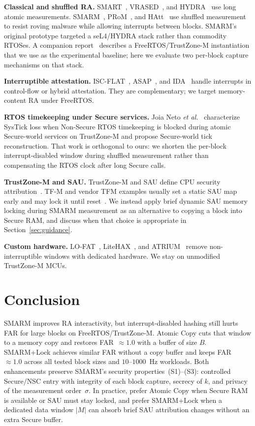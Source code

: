 \documentclass[conference]{IEEEtran}
\newcommand{\smarmlock}{SMARM+Lock\xspace}
\begin{document}
\textbf{Classical and shuffled RA.}
SMART~\cite{eldefrawy2012smart}, VRASED~\cite{nunes2019vrased}, and
HYDRA~\cite{eldefrawy2017hydra} use long atomic measurements.
SMARM~\cite{carpent2018smarm}, PRoM~\cite{aman2021prom}, and
HAtt~\cite{aman2018hatt} use shuffled measurement to resist roving
malware while allowing interrupts between blocks. SMARM's original
prototype targeted a seL4/HYDRA stack rather than commodity RTOSes.
A companion report~\cite{smarmplus2026} describes a FreeRTOS/TrustZone-M
instantiation that we use as the experimental baseline; here we evaluate
two per-block capture mechanisms on that stack.

\textbf{Interruptible attestation.}
ISC-FLAT~\cite{isc-flat}, ASAP~\cite{asap}, and IDA~\cite{ida2024}
handle interrupts in control-flow or hybrid attestation. They are
complementary; we target memory-content RA under FreeRTOS.

\textbf{RTOS timekeeping under Secure services.}
Joia Neto \emph{et al.}~\cite{joianeto2026timekeeping} characterize
SysTick loss when Non-Secure RTOS timekeeping is blocked during atomic
Secure-world services on TrustZone-M and propose Secure-world tick
reconstruction. That work is orthogonal to ours: we shorten the
per-block interrupt-disabled window during shuffled measurement rather
than compensating the RTOS clock after long Secure calls.

\textbf{TrustZone-M and SAU.}
TrustZone-M and SAU define CPU security
attribution~\cite{trustzone2025,armv8m-arm,an5347,cmsis-tz}. TF-M and
vendor TFM examples usually set a static SAU map early and may lock it
until reset~\cite{tfm2024,tfm-isolation,um2851}.
We instead apply brief dynamic SAU memory locking during SMARM
measurement as an alternative to copying a block into Secure RAM, and
discuss when that choice is appropriate in Section~\ref{sec:guidance}.

\textbf{Custom hardware.}
LO-FAT~\cite{lo-fat}, LiteHAX~\cite{litehax}, and ATRIUM~\cite{atrium}
remove non-interruptible windows with dedicated hardware. We stay on
unmodified TrustZone-M MCUs.

\section{Conclusion}
\label{sec:conclusion}

SMARM improves RA interactivity, but interrupt-disabled hashing still
hurts FAR for large blocks on FreeRTOS/TrustZone-M. Atomic Copy cuts
that window to a memory copy and restores FAR~$\approx 1.0$ with a
buffer of size $B$.
\smarmlock{} achieves similar FAR without a copy buffer and keeps
FAR~$\approx 1.0$ across all tested block sizes and $10$--$1000$~Hz
workloads.
Both enhancements preserve SMARM's
security properties~(S1)--(S3): controlled Secure/NSC entry with
integrity of each block capture, secrecy of $k$, and privacy of the
measurement order~$\sigma$. In practice, prefer Atomic Copy when
Secure RAM is available or SAU must stay locked, and prefer \smarmlock{}
when a dedicated data window $|M|$ can absorb brief SAU attribution
changes without an extra Secure buffer.



\end{document}
